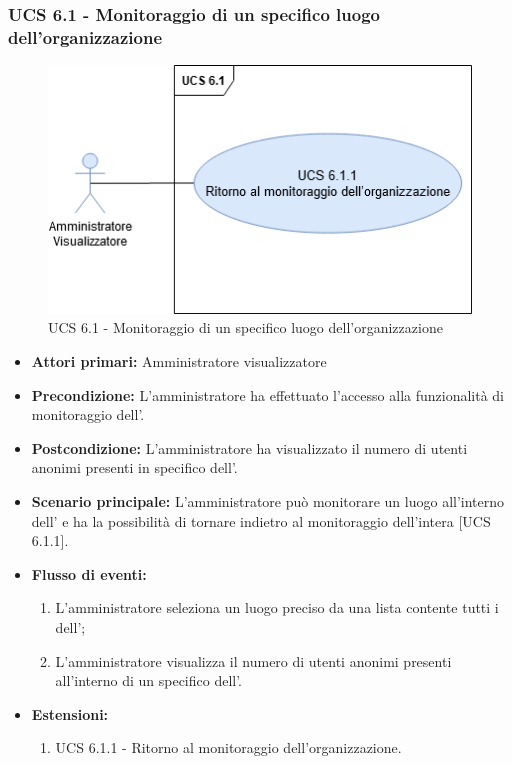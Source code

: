 \subsubsection{UCS 6.1 - Monitoraggio di un specifico luogo dell'organizzazione}

\begin{figure}[h]
	\centering
    \includegraphics[scale=0.50]{Sezioni/UseCase/Immagini/UCS6.1.png}
    \caption{UCS 6.1 - Monitoraggio di un specifico luogo dell'organizzazione}
\end{figure}

\begin{itemize}
	\item \textbf{Attori primari:} Amministratore visualizzatore
	\item \textbf{Precondizione:} L'amministratore ha effettuato l'accesso alla funzionalità di monitoraggio dell'.
	\item \textbf{Postcondizione:} L'amministratore ha visualizzato il numero di utenti anonimi presenti in specifico  dell'.
	\item \textbf{Scenario principale:} L'amministratore può monitorare un luogo all'interno dell' e ha la possibilità di tornare indietro al monitoraggio dell'intera  [UCS 6.1.1].
	\item \textbf{Flusso di eventi:}
	\begin{enumerate}
	\item L'amministratore seleziona un luogo preciso da una lista contente tutti i  dell';
	\item L'amministratore visualizza il numero di utenti anonimi presenti all'interno di un specifico  dell'.
	\end{enumerate}
	\item \textbf{Estensioni:}
    \begin{enumerate}
        \item UCS 6.1.1 - Ritorno al monitoraggio dell'organizzazione.
    \end{enumerate}
\end{itemize}

